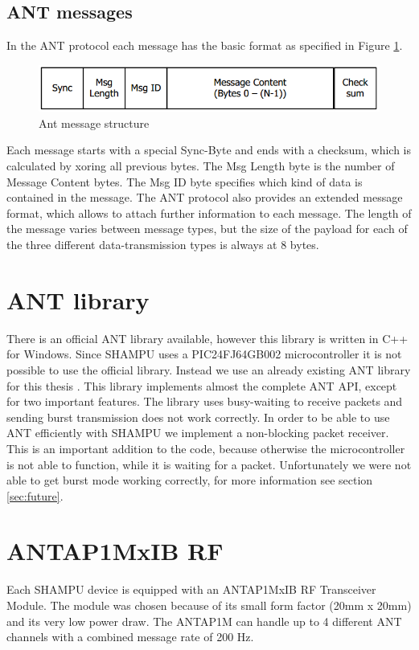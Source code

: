 \subsection{ANT messages}
In the ANT protocol each message has the basic format as specified in Figure \ref{fig:antmsg}.
\begin{figure}[H]
	\centering
	\includegraphics[scale=.75]{content/images/ANTmsg.png}
	\caption{Ant message structure\cite{DynastreamInnovationsInc.2013}}\label{fig:antmsg}
\end{figure}
Each message starts with a special Sync-Byte and ends with a checksum, which is calculated by xoring all previous bytes. The Msg Length byte is the number of Message Content bytes. The Msg ID byte specifies which kind of data is contained in the message. The ANT protocol also provides an extended message format, which allows to attach further information to each message. The length of the message varies between message types, but the size of the payload for each of the three different data-transmission types is always at 8 bytes.

\section{ANT library}
There is an official ANT library \cite{ANTWinLib} available, however this library is written in C++ for Windows. Since SHAMPU uses a PIC24FJ64GB002 microcontroller\cite{Smeets:2014:DAL:2602339.2602401} it is not possible to use the official library. Instead we use an already existing ANT library for this thesis \cite{ANTPICLIB}. This library implements almost the complete ANT API, except for two important features. The library uses busy-waiting to receive packets and sending burst transmission does not work correctly. In order to be able to use ANT efficiently with SHAMPU we implement a non-blocking packet receiver. This is an important addition to the code, because otherwise the microcontroller is not able to function, while it is waiting for a packet. Unfortunately we were not able to get burst mode working correctly, for more information see section \ref{sec:future}.

\section{ANTAP1MxIB RF}
Each SHAMPU device is equipped with an ANTAP1MxIB RF Transceiver Module. The module was chosen because of its small form factor (20mm x 20mm) and its very low power draw. The ANTAP1M can handle up to 4 different ANT channels with a combined message rate of 200 Hz. 

